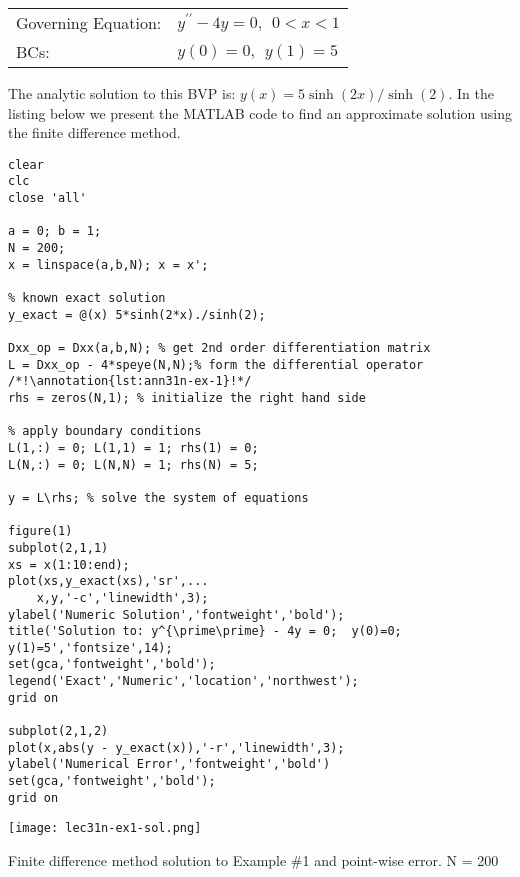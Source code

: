 \begin{table}
\begin{tabular}{l l}
Governing Equation: & $y^{\prime \prime} -4y = 0, \ \ 0 < x < 1$ \\
BCs: & $y(0) = 0, \ \ y(1) = 5$ \\
\end{tabular}
\end{table}

\vspace{0.25cm}

\noindent The analytic solution to this BVP is: $y(x) = 5\sinh{(2x)}/\sinh{(2)}$.  In the listing below we present the MATLAB code to find an approximate solution using the finite difference method.

\setcounter{lstannotation}{0}

\begin{lstlisting}[style=myMatlab,name=lec31n-ex1]
clear
clc
close 'all'

a = 0; b = 1;
N = 200;
x = linspace(a,b,N); x = x';

% known exact solution
y_exact = @(x) 5*sinh(2*x)./sinh(2);

Dxx_op = Dxx(a,b,N); % get 2nd order differentiation matrix
L = Dxx_op - 4*speye(N,N);% form the differential operator /*!\annotation{lst:ann31n-ex-1}!*/
rhs = zeros(N,1); % initialize the right hand side

% apply boundary conditions
L(1,:) = 0; L(1,1) = 1; rhs(1) = 0; 
L(N,:) = 0; L(N,N) = 1; rhs(N) = 5;

y = L\rhs; % solve the system of equations

figure(1)
subplot(2,1,1)
xs = x(1:10:end);
plot(xs,y_exact(xs),'sr',...
    x,y,'-c','linewidth',3);
ylabel('Numeric Solution','fontweight','bold');
title('Solution to: y^{\prime\prime} - 4y = 0;  y(0)=0; y(1)=5','fontsize',14);
set(gca,'fontweight','bold');
legend('Exact','Numeric','location','northwest');
grid on

subplot(2,1,2)
plot(x,abs(y - y_exact(x)),'-r','linewidth',3);
ylabel('Numerical Error','fontweight','bold')
set(gca,'fontweight','bold');
grid on
\end{lstlisting}
\begin{marginfigure}[-10.0cm]
\texttt{[image: lec31n-ex1-sol.png]}
\caption{Finite difference method solution to Example \#1 and point-wise error. N = 200}
\label{fig:lec31n-ex1-sol}
\end{marginfigure}

